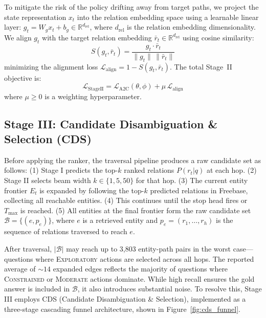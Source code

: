 \documentclass[10pt,conference]{IEEEtran}
\begin{document}
To mitigate the risk of the policy drifting away from target paths, we project the state representation $x_t$ into the relation embedding space using a learnable linear layer: $g_t = W_g x_t + b_g \in \mathbb{R}^{d_{\text{rel}}}$, where $d_{\text{rel}}$ is the relation embedding dimensionality. We align $g_t$ with the target relation embedding $\bar{r}_t \in \mathbb{R}^{d_{\text{rel}}}$ using cosine similarity:
\begin{equation}
S(g_t, \bar{r}_t) = \frac{g_t \cdot \bar{r}_t}{\|g_t\|\,\|\bar{r}_t\|}
\end{equation}
minimizing the alignment loss $\mathcal{L}_{\text{align}} = 1 - S(g_t, \bar{r}_t)$. The total Stage~II objective is:
\begin{equation}
\mathcal{L}_{\text{StageII}} = \mathcal{L}_{\text{A2C}}(\theta,\phi) + \mu\,\mathcal{L}_{\text{align}}
\end{equation}
where $\mu \ge 0$ is a weighting hyperparameter.

\subsection{Stage III: Candidate Disambiguation \& Selection (CDS)}
\label{sec:stage3}

Before applying the ranker, the traversal pipeline produces a raw candidate set as follows: (1) Stage I predicts the top-$k$ ranked relations $P(r_t|q)$ at each hop. (2) Stage II selects beam width $k \in \{1, 5, 50\}$ for that hop. (3) The current entity frontier $E_t$ is expanded by following the top-$k$ predicted relations in Freebase, collecting all reachable entities. (4) This continues until the stop head fires or $T_{\text{max}}$ is reached. (5) All entities at the final frontier form the raw candidate set $\mathcal{B} = \{(e, p_e)\}$, where $e$ is a retrieved entity and $p_e = (r_1, \dots, r_h)$ is the sequence of relations traversed to reach $e$.

After traversal, $|\mathcal{B}|$ may reach up to 3,803 entity-path pairs in the worst case---questions where \textsc{Exploratory} actions are selected across all hops. The reported average of ${\sim}14$ expanded edges reflects the majority of questions where \textsc{Constrained} or \textsc{Moderate} actions dominate. While high recall ensures the gold answer is included in $\mathcal{B}$, it also introduces substantial noise. To resolve this, Stage III employs CDS (Candidate Disambiguation \& Selection), implemented as a three-stage cascading funnel architecture, shown in Figure~\ref{fig:cds_funnel}.
\end{document}
